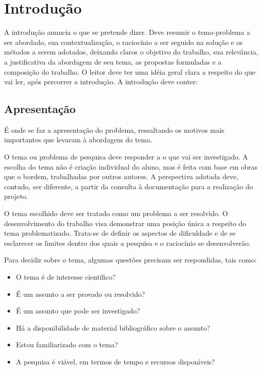 \chapter{Introdução}

A introdução anuncia o que se pretende dizer. Deve resumir o tema-problema a ser
abordado, sua contextualização, o raciocínio a ser seguido na solução e os
métodos a serem adotados, deixando claros o objetivo do trabalho, sua
relevância, a justificativa da abordagem de seu tema, as propostas formuladas e
a composição do trabalho. O leitor deve ter uma idéia geral clara a respeito do
que vai ler, após percorrer a introdução. A introdução deve conter:


\section{Apresentação}

É onde se faz a apresentação do problema, ressaltando os motivos mais
importantes que levaram à abordagem do tema.

O tema ou problema de pesquisa deve responder a o que vai ser investigado. A
escolha do tema não é criação individual do aluno, mas é feita com base em obras
que o bordem, trabalhadas por outros autores. A perspectiva adotada deve,
contudo, ser diferente, a partir da consulta à documentação para a realização do
projeto.

O tema escolhido deve ser tratado como um problema a ser resolvido. O
desenvolvimento do trabalho visa demonstrar uma posição única a respeito do tema
problematizado. Trata-se de definir os aspectos de dificuldade e de se
esclarecer os limites dentro dos quais a pesquisa e o raciocínio se
desenvolverão.

Para decidir sobre o tema, algumas questões precisam ser respondidas, tais como:

\begin{itemize}
    \item O tema é de interesse científico?
    \item É um assunto a ser provado ou resolvido?
    \item É um assunto que pode ser investigado?
    \item Há a disponibilidade de material bibliográfico sobre o assunto?
    \item Estou familiarizado com o tema?
    \item A pesquisa é viável, em termos de tempo e recursos disponíveis?
\end{itemize}

